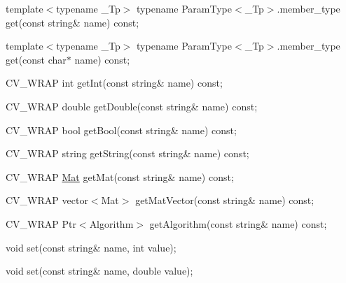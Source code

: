 {\ttfamily }

{\ttfamily template$<$typename \+\_\+\+Tp$>$ typename Param\+Type$<$\+\_\+\+Tp$>$.\+member\+\_\+type get(const string\& name) const;}

{\ttfamily }

{\ttfamily }

{\ttfamily template$<$typename \+\_\+\+Tp$>$ typename Param\+Type$<$\+\_\+\+Tp$>$.\+member\+\_\+type get(const char$\ast$ name) const;}

{\ttfamily }

{\ttfamily }

{\ttfamily C\+V\+\_\+\+W\+R\+AP int get\+Int(const string\& name) const;}

{\ttfamily }

{\ttfamily }

{\ttfamily C\+V\+\_\+\+W\+R\+AP double get\+Double(const string\& name) const;}

{\ttfamily }

{\ttfamily }

{\ttfamily C\+V\+\_\+\+W\+R\+AP bool get\+Bool(const string\& name) const;}

{\ttfamily }

{\ttfamily }

{\ttfamily C\+V\+\_\+\+W\+R\+AP string get\+String(const string\& name) const;}

{\ttfamily }

{\ttfamily }

{\ttfamily C\+V\+\_\+\+W\+R\+AP \mbox{\hyperlink{classorg_1_1opencv_1_1core_1_1_mat}{Mat}} get\+Mat(const string\& name) const;}

{\ttfamily }

{\ttfamily }

{\ttfamily C\+V\+\_\+\+W\+R\+AP vector$<$\+Mat$>$ get\+Mat\+Vector(const string\& name) const;}

{\ttfamily }

{\ttfamily }

{\ttfamily C\+V\+\_\+\+W\+R\+AP Ptr$<$\+Algorithm$>$ get\+Algorithm(const string\& name) const;}

{\ttfamily }

{\ttfamily }

{\ttfamily void set(const string\& name, int value);}

{\ttfamily }

{\ttfamily }

{\ttfamily void set(const string\& name, double value);}

{\ttfamily }

